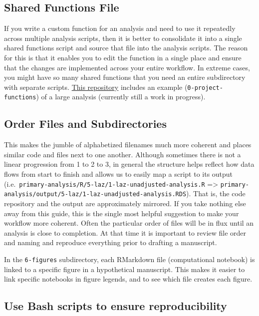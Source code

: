 \documentclass[
]{book}
\begin{document}
\hypertarget{shared-functions-file}{%
\subsection{Shared Functions File}\label{shared-functions-file}}

If you write a custom function for an analysis and need to use it repeatedly across multiple analysis scripts, then it is better to consolidate it into a single shared functions script and source that file into the analysis scripts. The reason for this is that it enables you to edit the function in a single place and ensure that the changes are implemented across your entire workflow. In extreme cases, you might have so many shared functions that you need an entire subdirectory with separate scripts. \href{https://github.com/HBGD-UCB/ki-longitudinal-manuscripts/}{This repository} includes an example (\texttt{0-project-functions}) of a large analysis (currently still a work in progress).

\hypertarget{order-files-and-subdirectories}{%
\subsection{Order Files and Subdirectories}\label{order-files-and-subdirectories}}

This makes the jumble of alphabetized filenames much more coherent and places similar code and files next to one another. Although sometimes there is not a linear progression from 1 to 2 to 3, in general the structure helps reflect how data flows from start to finish and allows us to easily map a script to its output (i.e.~\texttt{primary-analysis/R/5-laz/1-laz-unadjusted-analysis.R} =\textgreater{} \texttt{primary-analysis/output/5-laz/1-laz-unadjusted-analysis.RDS}). That is, the code repository and the output are approximately mirrored. If you take nothing else away from this guide, this is the single most helpful suggestion to make your workflow more coherent. Often the particular order of files will be in flux until an analysis is close to completion. At that time it is important to review file order and naming and reproduce everything prior to drafting a manuscript.

In the \texttt{6-figures} subdirectory, each RMarkdown file (computational notebook) is linked to a specific figure in a hypothetical manuscript. This makes it easier to link specific notebooks in figure legends, and to see which file creates each figure.

\hypertarget{use-bash-scripts-to-ensure-reproducibility}{%
\subsection{Use Bash scripts to ensure reproducibility}\label{use-bash-scripts-to-ensure-reproducibility}}
\end{document}
